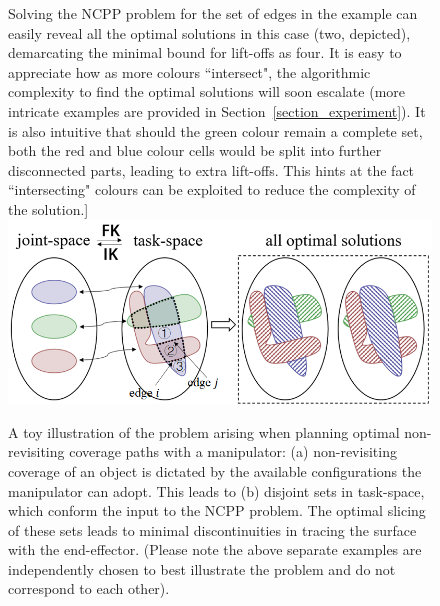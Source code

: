 \documentclass[journal]{IEEEtran}
\begin{document}
\begin{figure}[t]
Solving the NCPP problem for the set of edges in the example can easily reveal all the optimal solutions in this case (two, depicted), demarcating the minimal bound for lift-offs as four. 
It is easy to appreciate how as more colours ``intersect", the algorithmic complexity to find the optimal solutions will soon escalate (more intricate examples are provided in Section~\ref{section_experiment}). It is also intuitive that should the green colour remain a complete set, both the red and blue colour cells would be split into further disconnected parts, 
leading to extra lift-offs. This hints at the fact ``intersecting" colours can be exploited to reduce the complexity of the solution.]{
	\includegraphics[width = 0.97\columnwidth]{figures/mapping_2}
	\label{fig:toy_coverage_graph_example}
}
\caption{A toy illustration of the problem arising when planning optimal non-revisiting coverage paths with a manipulator: (a) non-revisiting coverage of an object is dictated by the 
available configurations the manipulator can adopt. This leads to (b) disjoint sets in task-space, which conform the input to the NCPP problem. The optimal slicing of these sets leads to minimal discontinuities in tracing the surface with the end-effector. (Please note the above separate examples are independently chosen to best illustrate the problem and do not correspond to each other).
}
\label{fig:mapping}
\end{figure}
\end{document}
